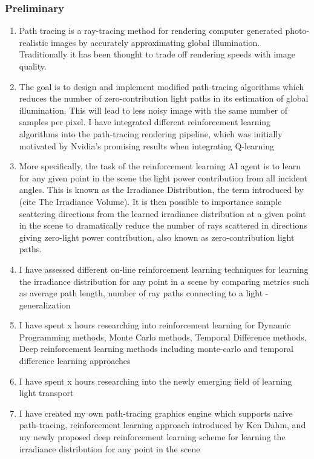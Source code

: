 \documentclass[ %
                    author={Callum Pearce},
                supervisor={Dr. Neill Campbell},
                    degree={MEng},
                     title={How effective are Temporal difference learning methods in reducing the number of zero contribution light paths in Path tracing?},
                  subtitle={},
                      type={research},
                      year={2019} ]{dissertation}
\begin{document}
\subsubsection{Preliminary}
\begin{enumerate}
\item Path tracing is a ray-tracing method for rendering computer generated 
photo-realistic images by accurately approximating global illumination. 
Traditionally it has been thought to trade off rendering speeds with image quality. 

\item The goal is to design and implement modified path-tracing algorithms
 which reduces the number of zero-contribution light paths in its estimation 
 of global illumination. This will lead to less noisy image with the same number
 of samples per pixel. I have integrated different reinforcement learning 
 algorithms into the path-tracing rendering pipeline, which was initially motivated 
 by  Nvidia's promising results when integrating Q-learning %

\item More specifically, the task of the reinforcement learning AI agent is to learn 
for any given point in the scene the light power contribution from all incident angles. 
This is known as the Irradiance Distribution, the term introduced by (cite The 
Irradiance Volume). It is then possible to importance sample scattering directions 
from the learned irradiance distribution at a given point in the scene to dramatically
reduce the number of rays scattered in directions giving zero-light power 
contribution, also known as zero-contribution light paths. 

\item I have assessed different on-line reinforcement learning techniques for learning
 the irradiance distribution for any point in a scene by comparing metrics such as
  average path length, number of ray paths connecting to a light - generalization

\item I have spent x hours researching into reinforcement learning for Dynamic 
Programming methods, Monte Carlo methods, Temporal Difference methods, Deep
 reinforcement learning methods including monte-carlo and temporal difference 
 learning approaches

\item I have spent x hours researching into the newly emerging field of learning 
light transport

\item I have created my own path-tracing graphics engine which supports naive 
path-tracing, reinforcement learning approach introduced by Ken Dahm, and my 
newly proposed deep reinforcement learning scheme for learning the irradiance 
distribution for any point in the scene
\end{enumerate}
\end{document}
